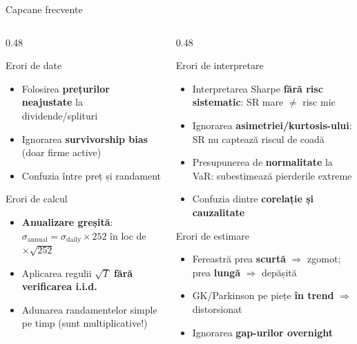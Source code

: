 \documentclass[9pt, aspectratio=169, t]{beamer}
\theoremstyle{definition}
\begin{document}
\begin{frame}[shrink=3]{Capcane frecvente}
\begin{columns}[T]
\begin{column}{0.48\textwidth}
\begin{alertblock}{Erori de date}
\begin{itemize}\setlength{\itemsep}{1pt}
    \item Folosirea \textbf{prețurilor neajustate} la dividende/splituri
    \item Ignorarea \textbf{survivorship bias} (doar firme active)
    \item Confuzia între preț și randament
\end{itemize}
\end{alertblock}
\vspace{0.05cm}
\begin{alertblock}{Erori de calcul}
\begin{itemize}\setlength{\itemsep}{1pt}
    \item \textbf{Anualizare greșită}: $\sigma_{\text{annual}} = \sigma_{\text{daily}} \times 252$ în loc de $\times\sqrt{252}$
    \item Aplicarea regulii $\sqrt{T}$ \textbf{fără verificarea i.i.d.}
    \item Adunarea randamentelor simple pe timp (sunt multiplicative!)
\end{itemize}
\end{alertblock}
\end{column}
\begin{column}{0.48\textwidth}
\begin{alertblock}{Erori de interpretare}
\begin{itemize}\setlength{\itemsep}{1pt}
    \item Interpretarea Sharpe \textbf{fără risc sistematic}: SR mare $\neq$ risc mic
    \item Ignorarea \textbf{asimetriei/kurtosis-ului}: SR nu captează riscul de coadă
    \item Presupunerea de \textbf{normalitate} la VaR: subestimează pierderile extreme
    \item Confuzia dintre \textbf{corelație și cauzalitate}
\end{itemize}
\end{alertblock}
\vspace{0.05cm}
\begin{alertblock}{Erori de estimare}
\begin{itemize}\setlength{\itemsep}{1pt}
    \item Fereastră prea \textbf{scurtă} $\Rightarrow$ zgomot; prea \textbf{lungă} $\Rightarrow$ depășită
    \item GK/Parkinson pe piețe \textbf{în trend} $\Rightarrow$ distorsionat
    \item Ignorarea \textbf{gap-urilor overnight}
\end{itemize}
\end{alertblock}
\end{column}
\end{columns}
\end{frame}
\end{document}
